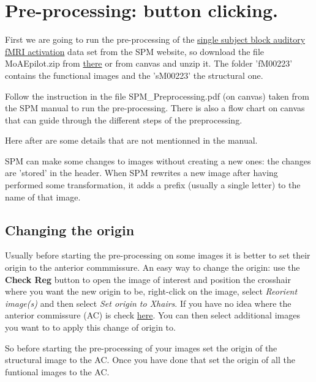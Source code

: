 \documentclass[a4paper,10pt]{article}
\begin{document}
\section{Pre-processing: button clicking.}

First we are going to run the pre-processing of the \href{http://www.fil.ion.ucl.ac.uk/spm/data/auditory/}{single subject block auditory fMRI activation} data set from the SPM website, so download the file MoAEpilot.zip from \href{http://www.fil.ion.ucl.ac.uk/spm/download/data/MoAEpilot/MoAEpilot.zip}{there} or from canvas and unzip it. The folder 'fM00223' contains the functional images and the 'sM00223' the structural one.

Follow the instruction in the file SPM\_Preprocessing.pdf (on canvas) taken from the SPM manual to run the pre-processing. There is also a flow chart on canvas that can guide through the different steps of the preprocessing. 

Here after are some details that are not mentionned in the manual.

SPM can make some changes to images without creating a new ones: the changes are 'stored' in the header. When SPM rewrites a new image after having performed some transformation, it adds a prefix (usually a single letter) to the name of that image.



\subsection{Changing the origin} \label{Changing the origin} 

Usually before starting the pre-processing on some images it is better to set their origin to the anterior commmissure. An easy way to change the origin: use the \textbf{Check Reg} button to open the image of interest and position the crosshair where you want the new origin to be, right-click on the image, select \textit{Reorient image(s)} and then select \textit{Set origin to Xhairs}. If you have no idea where the anterior commissure (AC) is check \href{http://headneckbrainspine.com/web_flash/newmodules/Brain\%20MRI.swf}{here}. You can then select additional images you want to to apply this change of origin to.

So before starting the pre-processing of your images set the origin of the structural image to the AC. Once you have done that set the origin of all the funtional images to the AC.
\end{document}
